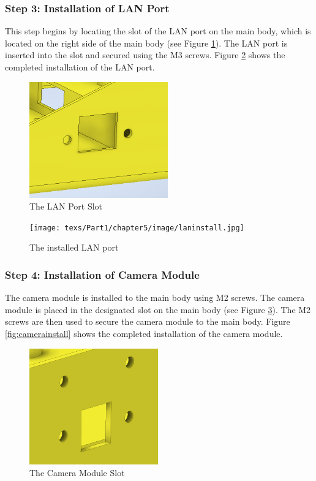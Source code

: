 \subsubsection{Step 3: Installation of LAN Port}

This step begins by locating the slot of the LAN port on the main body, which is located on the right side of the main body (see Figure \ref{fig:lanslot}). The LAN port is inserted into the slot and secured using the M3 screws. Figure \ref{fig:laninstall} shows the completed installation of the LAN port.

\begin{figure}
    \centering
    \includegraphics[height=5cm]{texs/Part1/chapter5/image/lanslot.png}
    \caption{The LAN Port Slot}
    \label{fig:lanslot}
\end{figure}

\begin{figure}
    \centering
    \texttt{[image: texs/Part1/chapter5/image/laninstall.jpg]}
    \caption{The installed LAN port}
    \label{fig:laninstall}
\end{figure}

\subsubsection{Step 4: Installation of Camera Module}

The camera module is installed to the main body using M2 screws. The camera module is placed in the designated slot on the main body (see Figure \ref{fig:cameraslot}). The M2 screws are then used to secure the camera module to the main body. Figure \ref{fig:camerainstall} shows the completed installation of the camera module.

\begin{figure}
    \centering
    \includegraphics[height=5cm]{texs/Part1/chapter5/image/camslot.png}
    \caption{The Camera Module Slot}
    \label{fig:cameraslot}
\end{figure}

